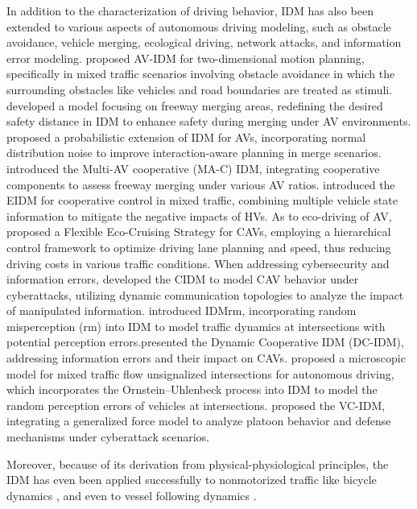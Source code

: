 \documentclass[a4paper,fleqn]{cas-sc}
\begin{document}
In addition to the characterization of driving behavior, IDM has also been extended to various aspects of autonomous driving modeling, such as obstacle avoidance, vehicle merging, ecological driving, network attacks, and information error modeling. \cite{sharath_enhanced_2020} proposed AV-IDM for two-dimensional motion planning, specifically in mixed traffic scenarios involving obstacle avoidance in which the surrounding obstacles like vehicles and road boundaries are treated as stimuli.\cite{chen_safety_2024} developed a model focusing on freeway merging areas, redefining the desired safety distance in IDM to enhance safety during merging under AV environments.\cite{ward_probabilistic_2017} proposed a probabilistic extension of IDM for AVs, incorporating normal distribution noise to improve interaction-aware planning in merge scenarios. \cite{zhou_impact_2017} introduced the Multi-AV cooperative (MA-C) IDM, integrating cooperative components to assess freeway merging under various AV ratios. \cite{zhou_cooperative_2023} introduced the EIDM for cooperative control in mixed traffic, combining multiple vehicle state information to mitigate the negative impacts of HVs. As to eco-driving of AV, \cite{dongFlexibleEcoCruisingStrategyConnected2024a} proposed a Flexible Eco-Cruising Strategy  for CAVs, employing a hierarchical control framework to optimize driving lane planning and speed, thus reducing driving costs in various traffic conditions. When addressing cybersecurity and information errors,\cite{wang_modeling_2020} developed the CIDM to model CAV behavior under cyberattacks, utilizing dynamic communication topologies to analyze the impact of manipulated information.  \cite{berkhahn_traffic_2022} introduced IDMrm, incorporating random misperception (rm) into IDM to model traffic dynamics at intersections with potential perception errors.\cite{li_unraveling_2024}presented the Dynamic Cooperative IDM (DC-IDM), addressing information errors and their impact on CAVs. \cite{liu_connected_2022} proposed a microscopic model for mixed traffic flow unsignalized intersections for autonomous driving, which incorporates the Ornstein–Uhlenbeck process into IDM to model the random perception errors of vehicles at intersections.\cite{luo_modeling_2024} proposed the VC-IDM, integrating a generalized force model to analyze platoon behavior and defense mechanisms under cyberattack scenarios.

Moreover, because of its derivation from physical-physiological principles, the IDM has even been applied successfully to nonmotorized traffic like bicycle dynamics \citep{kurtcSimulatingBicycleTrafficIntelligentdriver2020}, and even to vessel following dynamics \citep{jinVesselfollowingDynamicsExperimentModeling2023,yangEvaluationCarfollowingModelInland2023}.
\end{document}
